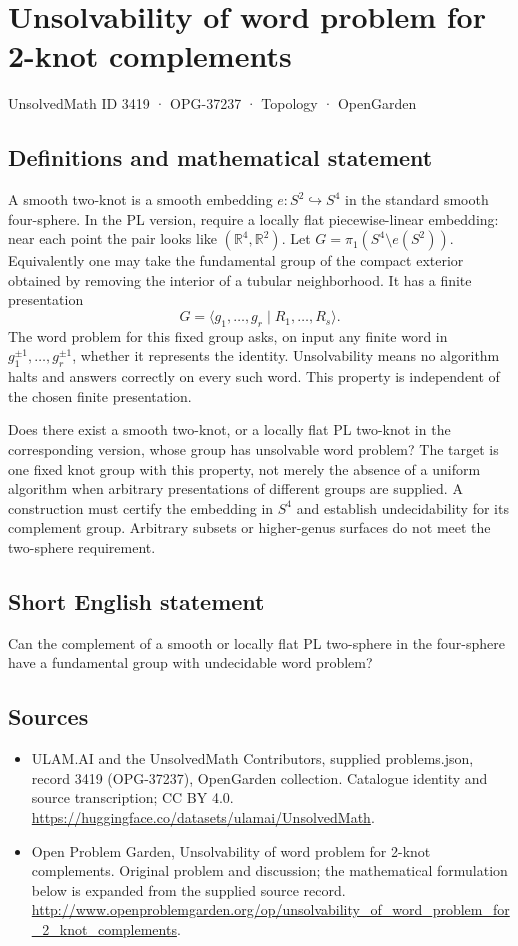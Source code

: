 \documentclass[11pt,a4paper]{article}
\begin{document}
\section*{Unsolvability of word problem for 2-knot complements}\label{3419}
{\small UnsolvedMath ID 3419 · OPG-37237 · Topology · OpenGarden}
\subsection{Definitions and mathematical statement}
A smooth two-knot is a smooth embedding $e:S^2\hookrightarrow S^4$
in the standard smooth four-sphere. In the PL version, require a
locally flat piecewise-linear embedding: near each point the pair
looks like $(\mathbb R^4,\mathbb R^2)$. Let
$G=\pi_1(S^4\setminus e(S^2))$. Equivalently one may take the
fundamental group of the compact exterior obtained by removing
the interior of a tubular neighborhood. It has a finite presentation
\[
                   G=\langle g_1,\ldots,g_r\mid R_1,\ldots,R_s\rangle.
\]
The word problem for this fixed group asks, on input any finite
word in $g_1^{\pm1},\ldots,g_r^{\pm1}$, whether it represents the
identity. Unsolvability means no algorithm halts and answers correctly
on every such word. This property is independent of the chosen
finite presentation.

Does there exist a smooth two-knot, or a locally flat PL two-knot
in the corresponding version, whose group has unsolvable word
problem? The target is one fixed knot group with this property,
not merely the absence of a uniform algorithm when arbitrary
presentations of different groups are supplied. A construction must
certify the embedding in $S^4$ and establish undecidability for
its complement group. Arbitrary subsets or higher-genus surfaces
do not meet the two-sphere requirement.
\subsection{Short English statement}
Can the complement of a smooth or locally flat PL two-sphere in the four-sphere have a fundamental group with undecidable word problem?
\subsection{Sources}
\begin{itemize}
\item[S1] ULAM.AI and the UnsolvedMath Contributors, supplied problems.json, record 3419 (OPG-37237), OpenGarden collection. Catalogue identity and source transcription; CC BY 4.0.
\url{https://huggingface.co/datasets/ulamai/UnsolvedMath}.
\item[S2] Open Problem Garden, Unsolvability of word problem for 2-knot complements. Original problem and discussion; the mathematical formulation below is expanded from the supplied source record.
\url{http://www.openproblemgarden.org/op/unsolvability_of_word_problem_for_2_knot_complements}.
\end{itemize}
\end{document}

